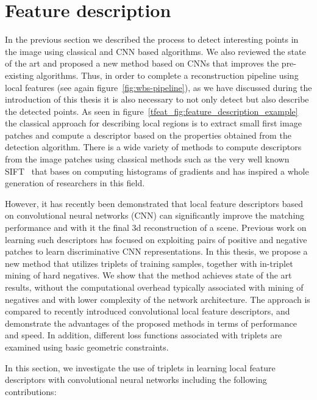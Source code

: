 \newpage

\section{Feature description}
\label{sec:local_descriptors}

In the previous section we described the process to detect interesting points in the image using classical and CNN based algorithms. We also reviewed the state of the art and proposed a new method based on CNNs that improves the pre-existing algorithms. Thus, in order to complete a reconstruction pipeline using local features (see again figure~\ref{fig:wbs-pipeline}), as we have discussed during the introduction of this thesis it is also necessary to not only detect but also describe the detected points. As seen in figure~\ref{tfeat_fig:feature_description_example} the classical approach for describing local regions is to extract small first image patches and compute a descriptor based on the properties obtained from the detection algorithm. There is a wide variety of methods to compute descriptors from the image patches using classical methods such as the very well known SIFT~\cite{SIFT} that bases on computing histograms of gradients and has inspired a whole generation of researchers in this field.

However, it has recently been demonstrated that local feature descriptors based on convolutional neural networks (CNN) can significantly improve the matching performance and with it the final 3d reconstruction of a scene.  Previous work on learning such descriptors has focused on exploiting pairs of positive and negative patches to learn discriminative CNN representations. In this thesis, we propose a new method that utilizes triplets of training samples, together with in-triplet mining of hard negatives. We show that the method achieves state of the art results, without the computational overhead typically associated with mining of negatives and with lower complexity of the network architecture.  The approach is compared to recently introduced convolutional local feature descriptors, and demonstrate the advantages of the proposed methods in terms of performance and speed.  In addition, different loss functions associated with triplets are examined using basic geometric constraints.

In this section, we investigate the use of triplets in learning local feature descriptors with convolutional neural networks including the following contributions:

